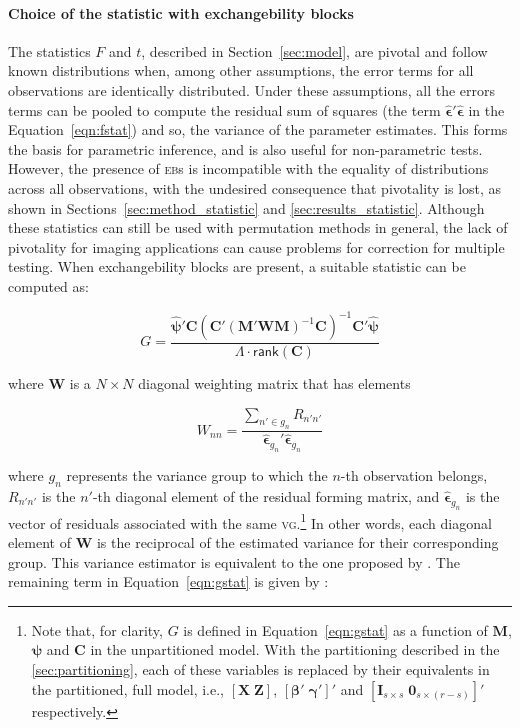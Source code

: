 \paragraph{Choice of the statistic with exchangebility blocks} The statistics $F$ and $t$, described in Section~\ref{sec:model}, are pivotal and follow known distributions when, among other assumptions, the error terms for all observations are identically distributed. Under these assumptions, all the errors terms can be pooled to compute the residual sum of squares (the term $\boldsymbol{\hat{\epsilon}}'\boldsymbol{\hat{\epsilon}}$ in the Equation~\ref{eqn:fstat}) and so, the variance of the parameter estimates. This forms the basis for parametric inference, and is also useful for non-parametric tests. However, the presence of \textsc{eb}s is incompatible with the equality of distributions across all observations, with the undesired consequence that pivotality is lost, as shown in Sections~\ref{sec:method_statistic} and \ref{sec:results_statistic}. Although these statistics can still be used with permutation methods in general, the lack of pivotality for imaging applications can cause problems for correction for multiple testing. When exchangebility blocks are present, a suitable statistic can be computed as:

\begin{equation}
G = \dfrac{\boldsymbol{\hat{\psi}}'\mathbf{C} \left(\mathbf{C}'(\mathbf{M}'\mathbf{W}\mathbf{M})^{-1}\mathbf{C} \right)^{-1} \mathbf{C}'\boldsymbol{\hat{\psi}}}{\Lambda \cdot \mathsf{rank}\left(\mathbf{C}\right)}
\label{eqn:gstat}
\end{equation}

\noindent
where $\mathbf{W}$ is a $N \times N$ diagonal weighting matrix that has elements

\begin{equation}
W_{nn} = \dfrac{\sum_{n' \in g_{n}}R_{n'n'}}{\boldsymbol{\hat{\epsilon}}_{g_{n}}'\boldsymbol{\hat{\epsilon}}_{g_{n}}}
\end{equation}

\noindent where $g_{n}$ represents the variance group to which the $n$-th observation belongs, $R_{n'n'}$ is the $n'$-th diagonal element of the residual forming matrix, and $\boldsymbol{\hat{\epsilon}}_{g_{n}}$ is the vector of residuals associated with the same \textsc{vg}.\footnote{Note that, for clarity, $G$ is defined in Equation~\ref{eqn:gstat} as a function of $\mathbf{M}$, $\boldsymbol{\psi}$ and $\mathbf{C}$ in the unpartitioned model. With the partitioning described in the \ref{sec:partitioning}, each of these variables is replaced by their equivalents in the partitioned, full model, i.e., $[\mathbf{X} \; \mathbf{Z}]$, $[\boldsymbol{\beta}' \; \boldsymbol{\gamma}']'$ and $[\mathbf{I}_{s \times s}\;\mathbf{0}_{s \times (r-s)}]'$ respectively.} In other words, each diagonal element of $\mathbf{W}$ is the reciprocal of the estimated variance for their corresponding group. This variance estimator is equivalent to the one proposed by \citet{Horn1975}. The remaining term in Equation~\ref{eqn:gstat} is given by \citep{Welch1951}:

